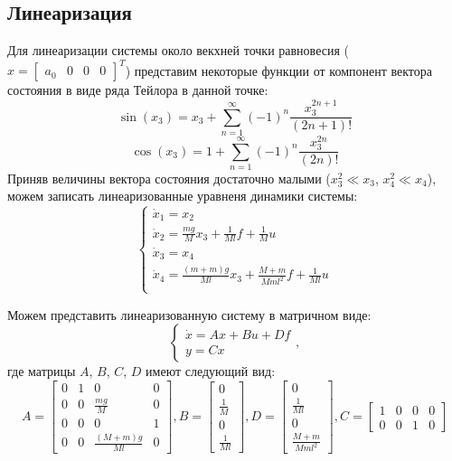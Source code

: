 \subsection{Линеаризация}
Для линеаризации системы около векхней точки равновесия ($x = \begin{bmatrix}
    a_0 & 0 & 0 & 0
\end{bmatrix}^T$) представим некоторые функции от компонент вектора состояния в виде ряда Тейлора в данной точке:
\begin{equation*}\sin(x_3) = x_3 + \sum_{n=1}^{\infty}(-1)^n\frac{x_3^{2n+1}}{(2n+1)!}\end{equation*}
\begin{equation*}\cos(x_3) = 1 + \sum_{n=1}^{\infty}(-1)^n\frac{x_3^{2n}}{(2n)!}\end{equation*}
Приняв величины вектора состояния достаточно малыми ($x_3^2 \ll x_3$, $x_4^2 \ll x_4$), можем записать линеаризованные уравненя динамики системы:
\begin{equation} \label{eq:10}
    \begin{cases}
        \dot x_1 = x_2 \\
        \dot x_2 = \frac{mg}{M}x_3 + \frac{1}{Ml}f + \frac{1}{M}u \\
        \dot x_3 = x_4 \\
        \dot x_4 = \frac{(m+m)g}{Ml}x_3 + \frac{M+m}{Mml^2}f + \frac{1}{Ml}u \\
    \end{cases}
\end{equation}

Можем представить линеаризованную систему в матричном виде:
\begin{equation} \label{eq:11}
    \begin{cases}
        \dot x = Ax + Bu + Df \\
        y = Cx
    \end{cases},
\end{equation}
где матрицы $A$, $B$, $C$, $D$ имеют следующий вид:
\begin{equation*}
    A = \begin{bmatrix}
        0 & 1 & 0 & 0 \\
        0 & 0 & \frac{mg}{M} & 0 \\
        0 & 0 & 0 & 1 \\
        0 & 0 & \frac{(M+m)g}{Ml} & 0
    \end{bmatrix},
    B = \begin{bmatrix}
        0 \\ \frac{1}{M} \\ 0 \\ \frac{1}{Ml}
    \end{bmatrix},
    D = \begin{bmatrix}
        0 \\ \frac{1}{Ml} \\ 0 \\ \frac{M+m}{Mml^2}
    \end{bmatrix},
    C = \begin{bmatrix}
        1 & 0 & 0 & 0 \\
        0 & 0 & 1 & 0
    \end{bmatrix}
\end{equation*}

